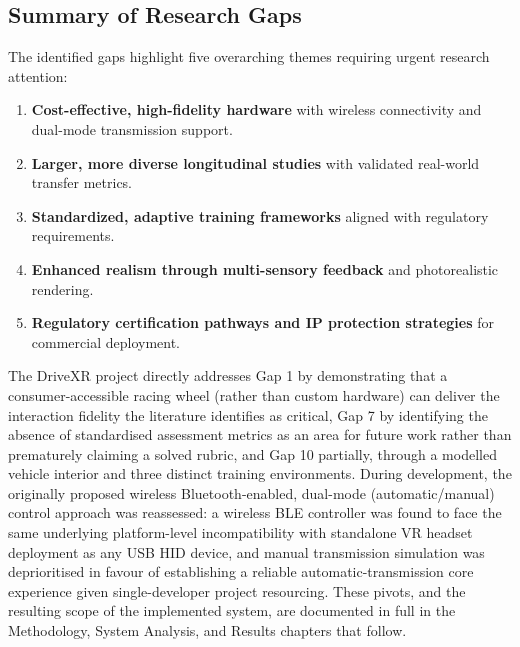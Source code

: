 \subsection{Summary of Research Gaps}
The identified gaps highlight five overarching themes requiring urgent research attention:
\begin{enumerate}
    \item \textbf{Cost-effective, high-fidelity hardware} with wireless connectivity and dual-mode transmission support.
    \item \textbf{Larger, more diverse longitudinal studies} with validated real-world transfer metrics.
    \item \textbf{Standardized, adaptive training frameworks} aligned with regulatory requirements.
    \item \textbf{Enhanced realism through multi-sensory feedback} and photorealistic rendering.
    \item \textbf{Regulatory certification pathways and IP protection strategies} for commercial deployment.
\end{enumerate}

\noindent The DriveXR project directly addresses Gap 1 by demonstrating that a consumer-accessible racing wheel (rather than custom hardware) can deliver the interaction fidelity the literature identifies as critical, Gap 7 by identifying the absence of standardised assessment metrics as an area for future work rather than prematurely claiming a solved rubric, and Gap 10 partially, through a modelled vehicle interior and three distinct training environments. During development, the originally proposed wireless Bluetooth-enabled, dual-mode (automatic/manual) control approach was reassessed: a wireless BLE controller was found to face the same underlying platform-level incompatibility with standalone VR headset deployment as any USB HID device, and manual transmission simulation was deprioritised in favour of establishing a reliable automatic-transmission core experience given single-developer project resourcing. These pivots, and the resulting scope of the implemented system, are documented in full in the Methodology, System Analysis, and Results chapters that follow. 